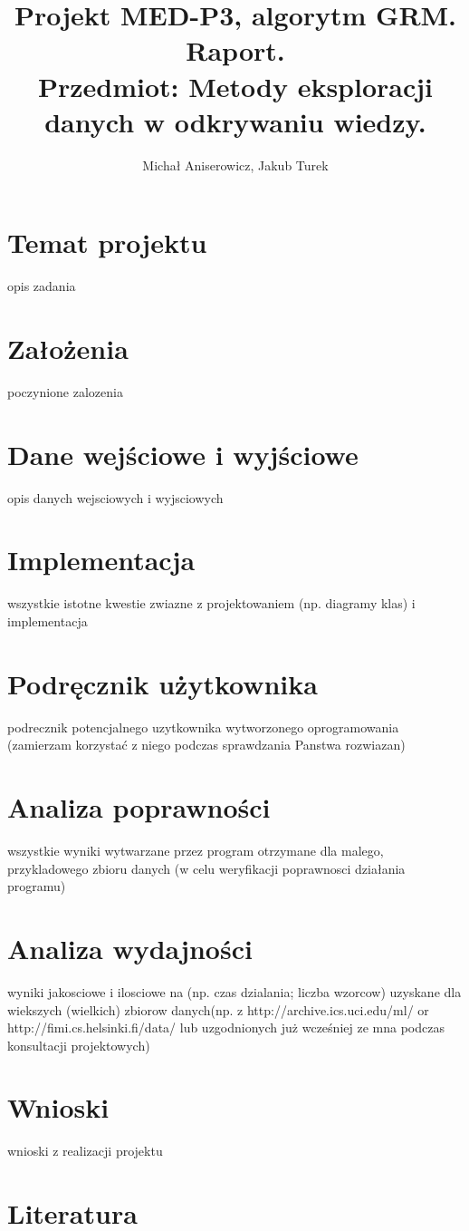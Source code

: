 \documentclass[a4paper,10pt]{article}
\title{Projekt MED-P3, algorytm GRM. Raport. \\ \small{Przedmiot: Metody eksploracji danych w odkrywaniu wiedzy.}}
\author{Michał Aniserowicz, Jakub Turek}
\date{}
\begin{document}
\maketitle

\section*{Temat projektu}
opis zadania



\section*{Założenia}
poczynione zalozenia



\section*{Dane wejściowe i wyjściowe}
opis danych wejsciowych i wyjsciowych



\section*{Implementacja}
wszystkie istotne kwestie zwiazne z projektowaniem (np. diagramy klas) i implementacja



\section*{Podręcznik użytkownika}
podrecznik potencjalnego uzytkownika wytworzonego oprogramowania
(zamierzam korzystać z niego podczas sprawdzania Panstwa rozwiazan)



\section*{Analiza poprawności}
wszystkie wyniki wytwarzane przez program otrzymane dla malego,
przykladowego zbioru danych (w celu weryfikacji poprawnosci działania
programu)



\section*{Analiza wydajności}
wyniki jakosciowe i ilosciowe na (np. czas dzialania; liczba wzorcow)
uzyskane dla wiekszych (wielkich) zbiorow danych(np. z
http://archive.ics.uci.edu/ml/ or http://fimi.cs.helsinki.fi/data/ lub
uzgodnionych już wcześniej ze mna podczas konsultacji projektowych)



\section*{Wnioski}
wnioski z realizacji projektu



\section*{Literatura}
\end{document}
